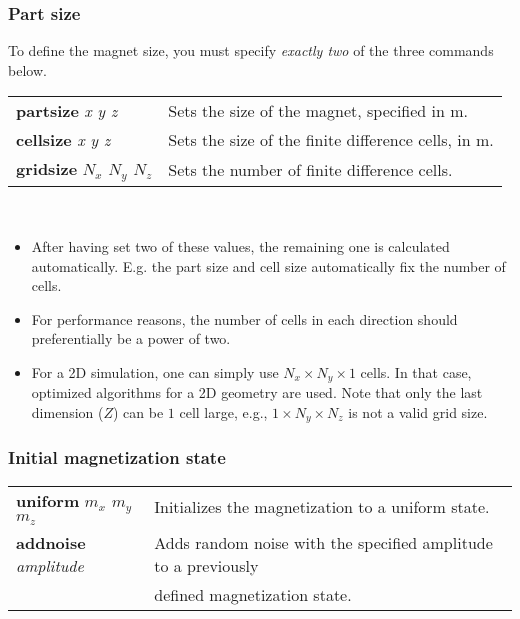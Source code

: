 \newcommand{\defcommand}[2][\space]{\textbf{#2}\index{#2}\label{#2} \textit{#1}}
\newcommand{\command}[1]{\hyperref[#1]{\textbf{#1}}\index{#1}\label{#1}}


\subsubsection*{Part size}
To define the magnet size, you must specify \emph{exactly two} of the three commands below.\\

\begin{tabular}{ll}
\defcommand[x y z]{partsize}  & Sets the size of the magnet, specified in m. \\
\defcommand[x y z]{cellsize}  & Sets the size of the finite difference cells, in m. \\
\defcommand[$N_x$ $N_y$ $N_z$]{gridsize} & Sets the number of finite difference cells.
\end{tabular}\\
\bigskip

\begin{itemize}
 \item After having set two of these values, the remaining one is calculated automatically. E.g. the part size and cell size automatically fix the number of cells.
 \item For performance reasons, the number of cells in each direction should preferentially be a power of two.
 \item For a 2D simulation, one can simply use $N_x \times N_y \times 1$ cells. In that case, optimized algorithms for a 2D geometry are used. Note that only the last dimension ($Z$) can be $1$ cell large, e.g., $1 \times N_y \times N_z$ is not a valid grid size.
\end{itemize}


\subsubsection*{Initial magnetization state}
\begin{tabular}{ll}
\defcommand[$m_x$ $m_y$ $m_z$]{uniform}  & Initializes the magnetization to a uniform state.\\
\defcommand[amplitude]{addnoise} & Adds random noise with the specified amplitude to a previously\\& defined magnetization state.
\end{tabular}




